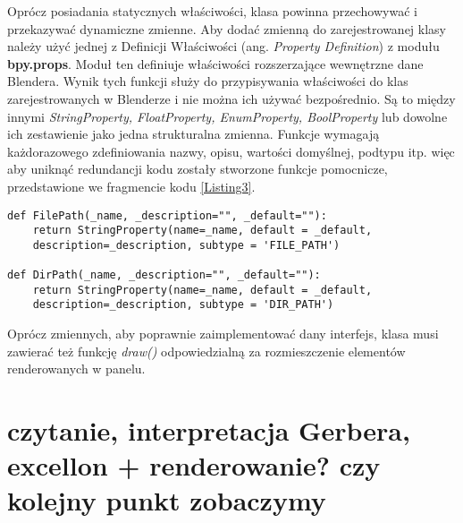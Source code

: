 \documentclass[brudnopis]{xmgr}
\begin{document}
Oprócz posiadania statycznych właściwości, klasa powinna przechowywać i przekazywać dynamiczne zmienne. Aby dodać zmienną do zarejestrowanej klasy należy użyć jednej z Definicji Właściwości (ang. \emph{Property Definition}) z modułu \textbf{bpy.props}. Moduł ten definiuje właściwości rozszerzające wewnętrzne dane Blendera. Wynik tych funkcji służy do przypisywania właściwości do klas zarejestrowanych w Blenderze i nie można ich używać bezpośrednio. Są to między innymi \emph{StringProperty, FloatProperty, EnumProperty, BoolProperty} lub dowolne ich zestawienie jako jedna strukturalna zmienna. Funkcje wymagają każdorazowego zdefiniowania nazwy, opisu, wartości domyślnej, podtypu itp. więc aby uniknąć redundancji kodu zostały stworzone funkcje pomocnicze, przedstawione we fragmencie kodu \ref{Listing3}.


\begin{lstlisting}
def FilePath(_name, _description="", _default=""):
	return StringProperty(name=_name, default = _default,
	description=_description, subtype = 'FILE_PATH')
    
def DirPath(_name, _description="", _default=""):
	return StringProperty(name=_name, default = _default,
	description=_description, subtype = 'DIR_PATH')
\end{lstlisting}


Oprócz zmiennych, aby poprawnie zaimplementować dany interfejs, klasa musi zawierać też funkcję \emph{draw()} odpowiedzialną za rozmieszczenie elementów renderowanych w panelu.

\section {czytanie, interpretacja Gerbera, excellon + renderowanie? czy kolejny punkt zobaczymy}
\end{document}
